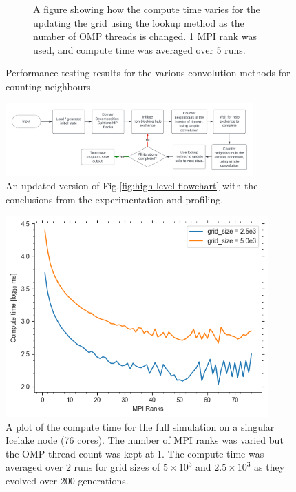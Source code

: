 \begin{figure}[t]
\begin{subfigure}{0.9\textwidth}
  \caption{A figure showing how the compute time varies for the updating the grid using the lookup method as the number
    of OMP threads is changed.
    1 MPI rank was used, and compute time was averaged over 5 runs.}
  \label{fig:lookup}
\end{subfigure}
\caption{Performance testing results for the various convolution methods for counting neighbours.}
\label{fig:trans}
\end{figure}

\begin{figure}[t]
\centering
\includegraphics[width=0.85\textwidth]{./figures/flowchat-2}
\caption{An updated version of Fig.\eqref{fig:high-level-flowchart} with the conclusions from the experimentation
and profiling.}
\label{fig:flowhcart-2}
\end{figure}

\begin{figure}[t]
\centering
\includegraphics[width=0.9\textwidth]{./figures/mpi_hpc}
\caption{A plot of the compute time for the full simulation on a singular Icelake node (76 cores).
    The number of MPI ranks was varied but the OMP thread count was kept at 1.
    The compute time was averaged over 2 runs for grid sizes of $5 \times 10^{3}$ and $2.5 \times 10^{3}$ as they evolved
    over 200 generations.}
\label{fig:mpi_hpc}
\end{figure}

